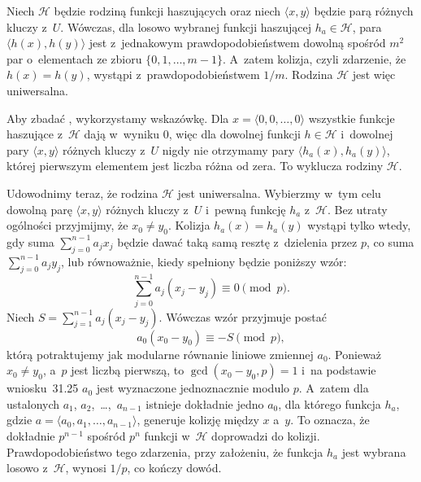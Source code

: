 \bigskip
{}

\subproblem %
Niech $\mathcal{H}$ będzie  rodziną funkcji haszujących oraz niech $\langle x,y\rangle$ będzie parą różnych kluczy z~$U$.
Wówczas, dla losowo wybranej funkcji haszującej $h_a\in\mathcal{H}$, para $\langle h(x),h(y)\rangle$ jest z~jednakowym prawdopodobieństwem dowolną spośród $m^2$ par o~elementach ze zbioru $\{0,1,\dots,m-1\}$.
A~zatem kolizja, czyli zdarzenie, że $h(x)=h(y)$, wystąpi z~prawdopodobieństwem $1/m$.
Rodzina $\mathcal{H}$ jest więc uniwersalna.

\subproblem %
Aby zbadać , wykorzystamy wskazówkę.
Dla $x=\langle0,0,\dots,0\rangle$ wszystkie funkcje haszujące z~$\mathcal{H}$ dają w~wyniku 0, więc dla dowolnej funkcji $h\in\mathcal{H}$ i~dowolnej pary $\langle x,y\rangle$ różnych kluczy z~$U$ nigdy nie otrzymamy pary $\langle h_a(x),h_a(y)\rangle$, której pierwszym elementem jest liczba różna od zera.
To wyklucza  rodziny $\mathcal{H}$.

Udowodnimy teraz, że rodzina $\mathcal{H}$ jest uniwersalna.
Wybierzmy w~tym celu dowolną parę $\langle x,y\rangle$ różnych kluczy z~$U$ i~pewną funkcję $h_a$ z~$\mathcal{H}$.
Bez utraty ogólności przyjmijmy, że $x_0\ne y_0$.
Kolizja $h_a(x)=h_a(y)$ wystąpi tylko wtedy, gdy suma $\sum_{j=0}^{n-1}a_jx_j$ będzie dawać taką samą resztę z~dzielenia przez $p$, co suma $\sum_{j=0}^{n-1}a_jy_j$, lub równoważnie, kiedy spełniony będzie poniższy wzór:
\[
	\sum_{j=0}^{n-1}a_j(x_j-y_j) \equiv 0 \pmod p.
\]
Niech $S=\sum_{j=1}^{n-1}a_j(x_j-y_j)$.
Wówczas wzór przyjmuje postać
\[
	a_0(x_0-y_0) \equiv -S \pmod p,
\]
którą potraktujemy jak modularne równanie liniowe zmiennej $a_0$.
Ponieważ $x_0\ne y_0$, a~$p$ jest liczbą pierwszą, to $\gcd(x_0-y_0,p)=1$ i~na podstawie wniosku~31.25 $a_0$ jest wyznaczone jednoznacznie modulo $p$.
A~zatem dla ustalonych $a_1$, $a_2$,~\dots,~$a_{n-1}$ istnieje dokładnie jedno $a_0$, dla którego funkcja $h_a$, gdzie $a=\langle a_0,a_1,\dots,a_{n-1}\rangle$, generuje kolizję między $x$ a~$y$.
To oznacza, że dokładnie $p^{n-1}$ spośród $p^n$ funkcji w~$\mathcal{H}$ doprowadzi do kolizji.
Prawdopodobieństwo tego zdarzenia, przy założeniu, że funkcja $h_a$ jest wybrana losowo z~$\mathcal{H}$, wynosi $1/p$, co kończy dowód.

